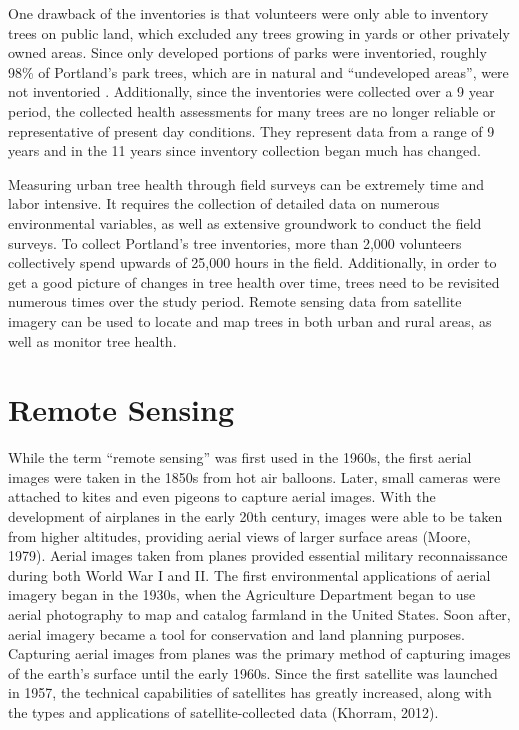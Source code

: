 \documentclass[12pt,twoside]{reedthesis}
\begin{document}
One drawback of the inventories is that volunteers were only able to
inventory trees on public land, which excluded any trees growing in
yards or other privately owned areas. Since only developed portions of
parks were inventoried, roughly 98\% of Portland's park trees, which are
in natural and ``undeveloped areas'', were not inventoried . Additionally,
since the inventories were collected over a 9 year period, the collected
health assessments for many trees are no longer reliable or
representative of present day conditions. They represent data from a
range of 9 years and in the 11 years since inventory collection began
much has changed.

Measuring urban tree health through field surveys can be extremely time
and labor intensive. It requires the collection of detailed data on
numerous environmental variables, as well as extensive groundwork to
conduct the field surveys. To collect Portland's tree inventories, more
than 2,000 volunteers collectively spend upwards of 25,000 hours in the
field. Additionally, in order to get a good picture of changes in tree
health over time, trees need to be revisited numerous times over the
study period. Remote sensing data from satellite imagery can be used to
locate and map trees in both urban and rural areas, as well as monitor
tree health.

\hypertarget{remote-sensing}{%
\section{Remote Sensing}\label{remote-sensing}}

While the term ``remote sensing'' was first used in the 1960s, the first
aerial images were taken in the 1850s from hot air balloons. Later,
small cameras were attached to kites and even pigeons to capture aerial
images. With the development of airplanes in the early 20th century,
images were able to be taken from higher altitudes, providing aerial
views of larger surface areas (Moore, 1979). Aerial images taken from
planes provided essential military reconnaissance during both World War
I and II. The first environmental applications of aerial imagery began
in the 1930s, when the Agriculture Department began to use aerial
photography to map and catalog farmland in the United States. Soon
after, aerial imagery became a tool for conservation and land planning
purposes. Capturing aerial images from planes was the primary method of
capturing images of the earth's surface until the early 1960s. Since the
first satellite was launched in 1957, the technical capabilities of
satellites has greatly increased, along with the types and applications
of satellite-collected data (Khorram, 2012).
\end{document}
